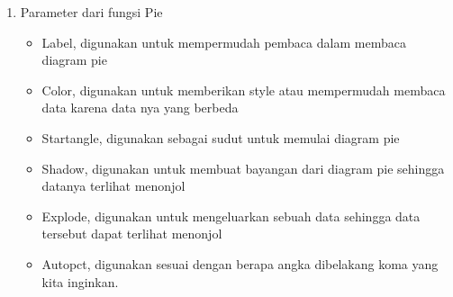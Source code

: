 \begin{enumerate}
\item Parameter dari fungsi Pie
\begin{itemize}
\item Label, digunakan untuk mempermudah pembaca dalam membaca diagram pie
\item Color, digunakan untuk memberikan style atau mempermudah membaca data karena data nya yang berbeda
\item Startangle, digunakan sebagai sudut untuk memulai diagram pie
\item Shadow, digunakan untuk membuat bayangan dari diagram pie sehingga datanya terlihat menonjol
\item Explode, digunakan untuk mengeluarkan sebuah data sehingga data tersebut dapat terlihat menonjol
\item Autopct, digunakan sesuai dengan berapa angka dibelakang koma yang kita inginkan.
\end{itemize}

\end{enumerate}